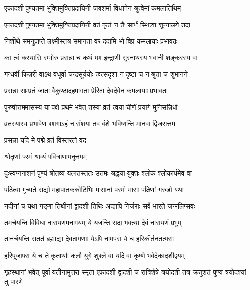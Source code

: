 \twolineshloka
{एकादशी पुण्यतमा भुक्तिमुक्तिप्रदायिनी}
{जयशर्मा विधानेन श्रुत्वेमां कमलातिथिम्}%

\twolineshloka
{एकादशी पुण्यतमा भुक्तिमुक्तिप्रदायिनी}
{व्रतं कृतं च तैः सार्धं स्थित्वा शून्यालये तदा}%

\twolineshloka
{निशीथे समनुप्राप्ते लक्ष्मीस्तत्र समागता}
{वरं ददामि भो विप्र कमलायाः प्रभावतः}%


\twolineshloka
{का त्वं कस्यासि रम्भोरु प्रसन्ना च कथं मम}
{इन्द्राणी सुरनाथस्य भवानी शङ्करस्य वा}%

\twolineshloka
{गन्धर्वी किन्नरी वाऽथ वधूर्वा चन्द्रसूर्ययोः}
{त्वत्सदृशा न दृष्टा च न श्रुता च शुभानने}%


\twolineshloka
{प्रसन्ना साम्प्रतं जाता वैकुण्ठादहमागता}
{प्रेरिता देवदेवेन कमलायाः प्रभावतः}%

\twolineshloka
{पुरुषोत्तममासस्य या पक्षे प्रथमे भवेत्}
{तस्या व्रतं त्वया चीर्णं प्रयागे मुनिसन्निधौ}%

\twolineshloka
{व्रतस्यास्य प्रभावेण वशगाऽहं न संशयः}
{तव वंशे भविष्यन्ति मानवा द्विजसत्तम}%


\onelineshloka
{प्रसन्ना यदि मे पद्मे व्रतं विस्तरतो वद}%

\onelineshloka
{श्रोतॄणां परमं श्राव्यं पवित्राणामनुत्तमम्}%

\twolineshloka
{दुःस्वप्ननाशनं पुण्यं श्रोतव्यं यत्नतस्ततः}
{उत्तमः श्रद्धया युक्तः श्लोकं श्लोकार्धमेव वा}%

\twolineshloka
{पठित्वा मुच्यते सद्यो महापातककोटिभिः}
{मासानां परमो मासः पक्षिणां गरुडो यथा}%

\twolineshloka
{नदीनां च यथा गङ्गा तिथीनां द्वादशी तिथिः}
{अद्यापि निर्जराः सर्वे भारते जन्मलिप्सवः}%

\twolineshloka
{तमर्चयन्ति विविधा नारायणमनामयम्}
{ये यजन्ति सदा भक्त्या देवं नारायणं प्रभुम्}%

\twolineshloka
{तानर्चयन्ति सततं ब्रह्माद्या देवतागणाः}
{येऽपि नामपरा ये च हरिकीर्तनतत्पराः}%

\twolineshloka
{हरिपूजापरा ये च ते कृतार्थाः कलौ युगे}
{शुक्ले वा यदि वा कृष्णे भवेदेकादशीद्वयम्}%

\threelineshloka
{गृहस्थानां भवेत् पूर्वा यतीनामुत्तरा स्मृता}
{एकादशी द्वादशी च रात्रिशेषे त्रयोदशी}
{तत्र क्रतुशतं पुण्यं त्रयोदश्यां तु पारणे}%

